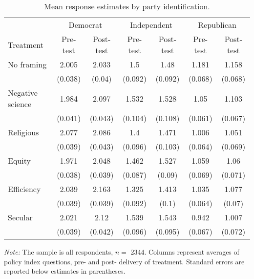 \begin{table*}

\caption{\label{tab:unnamed-chunk-17}Mean response estimates by party identification. \label{tab:party_means}}
\centering
\begin{threeparttable}
\begin{tabular}[t]{lcccccc}
\toprule
\multicolumn{1}{c}{ } & \multicolumn{2}{c}{Democrat} & \multicolumn{2}{c}{Independent} & \multicolumn{2}{c}{Republican} \\
Treatment & Pre-test & Post-test & Pre-test & Post-test & Pre-test & Post-test\\
\cmidrule(lr){2-3} \cmidrule(lr){4-5} \cmidrule(lr){6-7}
No framing & \num{2.005} & \num{2.033} & \num{1.5} & \num{1.48} & \num{1.181} & \num{1.158}\\
 & (\num{0.038}) & (\num{0.04}) & (\num{0.092}) & (\num{0.092}) & (\num{0.068}) & (\num{0.068})\\
\addlinespace
Negative science & \num{1.984} & \num{2.097} & \num{1.532} & \num{1.528} & \num{1.05} & \num{1.103}\\
 & (\num{0.041}) & (\num{0.043}) & (\num{0.104}) & (\num{0.108}) & (\num{0.061}) & (\num{0.067})\\
\addlinespace
Religious & \num{2.077} & \num{2.086} & \num{1.4} & \num{1.471} & \num{1.006} & \num{1.051}\\
 & (\num{0.039}) & (\num{0.043}) & (\num{0.096}) & (\num{0.103}) & (\num{0.064}) & (\num{0.069})\\
\addlinespace
Equity & \num{1.971} & \num{2.048} & \num{1.462} & \num{1.527} & \num{1.059} & \num{1.06}\\
 & (\num{0.038}) & (\num{0.039}) & (\num{0.087}) & (\num{0.09}) & (\num{0.069}) & (\num{0.071})\\
\addlinespace
Efficiency & \num{2.039} & \num{2.163} & \num{1.325} & \num{1.413} & \num{1.035} & \num{1.077}\\
 & (\num{0.039}) & (\num{0.039}) & (\num{0.092}) & (\num{0.1}) & (\num{0.064}) & (\num{0.07})\\
\addlinespace
Secular & \num{2.021} & \num{2.12} & \num{1.539} & \num{1.543} & \num{0.942} & \num{1.007}\\
 & (\num{0.039}) & (\num{0.042}) & (\num{0.096}) & (\num{0.095}) & (\num{0.067}) & (\num{0.072})\\
\bottomrule
\end{tabular}
\begin{tablenotes}
\item \footnotesize \textit{Note:} The sample is all respondents, $n = $ \num{2344}. Columns represent averages of policy index questions, pre- and post- delivery of treatment. Standard errors are reported below estimates in parentheses.
\end{tablenotes}
\end{threeparttable}
\end{table*}
